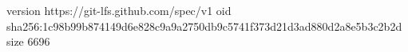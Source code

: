 version https://git-lfs.github.com/spec/v1
oid sha256:1c98b99b874149d6e828c9a9a2750db9c5741f373d21d3ad880d2a8e5b3c2b2d
size 6696
